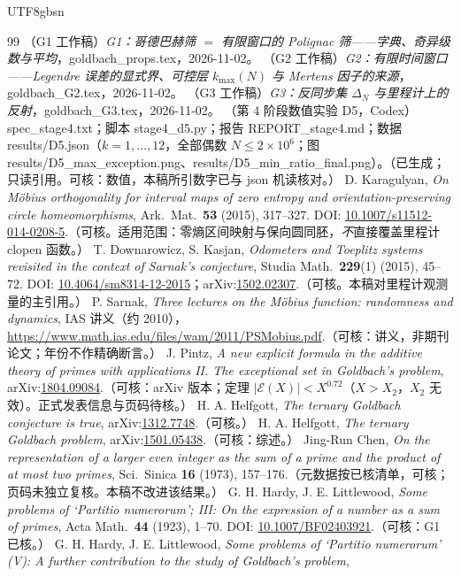 \documentclass[11pt,a4paper]{article}
\newcommand{\Exc}{\mathcal E}          %
\theoremstyle{plain}
\theoremstyle{definition}
\begin{document}
\begin{CJK}{UTF8}{gbsn}
\begin{thebibliography}{99}
 （G1 工作稿）\emph{G1：哥德巴赫筛 $=$ 有限窗口的 Polignac 筛——字典、奇异级数与平均}，goldbach\_props.tex，2026-11-02。
 （G2 工作稿）\emph{G2：有限时间窗口——Legendre 误差的显式界、可控层 $k_{\max}(N)$ 与 Mertens 因子的来源}，goldbach\_G2.tex，2026-11-02。
 （G3 工作稿）\emph{G3：反同步集 $\Delta_N$ 与里程计上的反射}，goldbach\_G3.tex，2026-11-02。
 （第 4 阶段数值实验 D5，Codex）spec\_stage4.txt；脚本 stage4\_d5.py；报告 REPORT\_stage4.md；数据 results/D5.json（$k=1,\dots,12$，全部偶数 $N\le2\times10^6$；图 results/D5\_max\_exception.png、results/D5\_min\_ratio\_final.png）。（已生成；只读引用。可核：数值，本稿所引数字已与 json 机读核对。）
 D. Karagulyan, \emph{On M\"obius orthogonality for interval maps of zero entropy and orientation-preserving circle homeomorphisms},
Ark.\ Mat.\ \textbf{53} (2015), 317--327. DOI: \url{10.1007/s11512-014-0208-5}.（可核。适用范围：零熵区间映射与保向圆同胚，\emph{不}直接覆盖里程计 clopen 函数。）
 T. Downarowicz, S. Kasjan, \emph{Odometers and Toeplitz systems revisited in the context of Sarnak's conjecture},
Studia Math.\ \textbf{229}(1) (2015), 45--72. DOI: \url{10.4064/sm8314-12-2015}；arXiv:\url{1502.02307}.（可核。本稿对里程计观测量的主引用。）
 P. Sarnak, \emph{Three lectures on the M\"obius function: randomness and dynamics}, IAS 讲义（约 2010），
\url{https://www.math.ias.edu/files/wam/2011/PSMobius.pdf}.（可核：讲义，非期刊论文；年份不作精确断言。）
 J. Pintz, \emph{A new explicit formula in the additive theory of primes with applications II. The exceptional set in Goldbach's problem},
arXiv:\url{1804.09084}.（可核：arXiv 版本；定理 $|\Exc(X)|<X^{0.72}$（$X>X_2$，$X_2$ 无效）。正式发表信息与页码待核。）
 H. A. Helfgott, \emph{The ternary Goldbach conjecture is true}, arXiv:\url{1312.7748}.（可核。）
 H. A. Helfgott, \emph{The ternary Goldbach problem}, arXiv:\url{1501.05438}.（可核：综述。）
 Jing-Run Chen, \emph{On the representation of a larger even integer as the sum of a prime and the product of at most two primes},
Sci.\ Sinica \textbf{16} (1973), 157--176.（元数据按已核清单，可核；页码未独立复核。本稿不改进该结果。）
 G. H. Hardy, J. E. Littlewood, \emph{Some problems of `Partitio numerorum'; III: On the expression of a number as a sum of primes},
Acta Math.\ \textbf{44} (1923), 1--70. DOI: \url{10.1007/BF02403921}.（可核：G1 已核。）
 G. H. Hardy, J. E. Littlewood, \emph{Some problems of `Partitio numerorum' (V): A further contribution to the study of Goldbach's problem},

\end{thebibliography}
\end{CJK}
\end{document}

